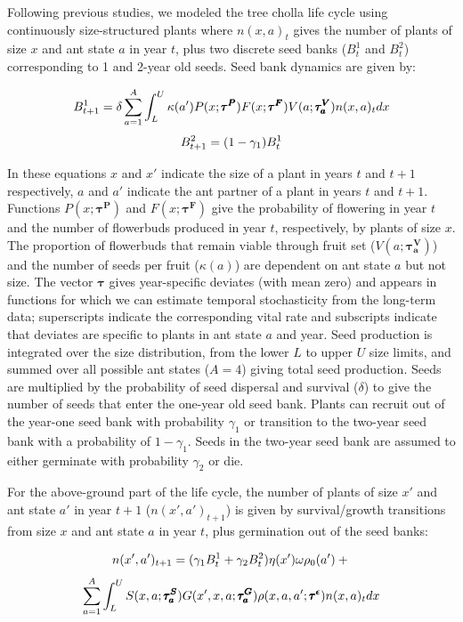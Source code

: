 \documentclass[11pt]{article}
\begin{document}
	Following previous studies, we modeled the tree cholla life cycle using continuously size-structured plants where $n(x,a)_{t}$ gives the number of plants of size $x$  and ant state $a$ in year $t$, plus two discrete seed banks ($B^1_{t}$ and $B^2_{t}$) corresponding to 1 and 2-year old seeds. 
	Seed bank dynamics are given by:
	
	\begin{linenomath*}
		$$
		B^1_{t+1} = \delta \sum_{a=1}^{A} \int_L^U  \kappa(a') P(x;\pmb{\tau^P}) F(x;\pmb{\tau^F}) V(a;\pmb{\tau^V_{a}}) n(x,a)_{t} dx \\
		$$
		$$
		B^2_{t+1} =  (1 - \gamma_1)B^1_{t}\\
		$$
	\end{linenomath*}
	
	\noindent In these equations $x$ and $x'$ indicate the size of a plant in years $t$ and $t+1$ respectively, $a$ and $a'$ indicate the ant partner of a plant in years $t$ and $t+1$.
	Functions $P(x;\pmb{\tau^P})$ and $F(x;\pmb{\tau^F})$ give the probability of flowering in year $t$ and the number of flowerbuds produced in year $t$, respectively, by plants of size $x$. 
	The proportion of flowerbuds that remain viable through fruit set ($V(a;\pmb{\tau^V_{a}})$) and the number of seeds per fruit ($\kappa(a)$) are dependent on ant state $a$ but not size. 
	The vector $\pmb{\tau}$ gives year-specific deviates (with mean zero) and appears in functions for which we can estimate temporal stochasticity from the long-term data; superscripts indicate the corresponding vital rate and subscripts indicate that deviates are specific to plants in ant state $a$ and year.
	Seed production is integrated over the size distribution, from the lower $L$ to upper $U$ size limits, and summed over all possible ant states ($A=4$) giving total seed production. 
	Seeds are multiplied by the probability of seed dispersal and survival ($\delta$) to give the number of seeds that enter the one-year old seed bank. 
	Plants can recruit out of the year-one seed bank with probability $\gamma_1$ or transition to the two-year seed bank with a probability of $1 - \gamma_1$. 
	Seeds in the two-year seed bank are assumed to either germinate with probability $\gamma_2$ or die. 
	
	For the above-ground part of the life cycle, the number of plants of size $x'$ and ant state $a'$ in year $t+1$ ($n(x',a')_{t+1}$) is given by survival/growth transitions from size $x$ and ant state $a$ in year $t$, plus germination out of the seed banks:
	\begin{linenomath*}
		$$
		n(x',a')_{t+1} = (\gamma_1 B^1_{t} + \gamma_2 B^2_{t} ) \eta(x') \omega \rho_{0}(a')  + \\
		$$
		$$
		\sum_{a=1}^{A} \int_L^U S(x,a;\pmb{\tau^S_{a}}) G(x',x,a;\pmb{\tau^G_{a}}) \rho(x,a,a';\pmb{\tau^{\epsilon}}) n(x,a)_t dx \\
		$$
	\end{linenomath*}
	
\end{document}
